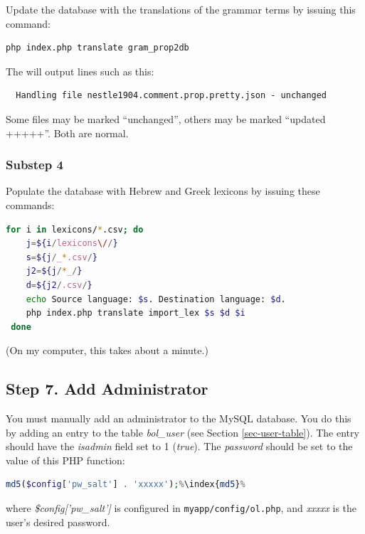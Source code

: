 \documentclass[11pt,oneside,a4paper]{memoir}
\newcommand{\q}{{\mainnolig '}}
\begin{document}
Update the database with the translations of the grammar terms by issuing this command:

\begin{lstlisting}[language=bash]
php index.php translate gram_prop2db
\end{lstlisting}

The will output lines such as this:

\begin{lstlisting}
  Handling file nestle1904.comment.prop.pretty.json - unchanged
\end{lstlisting}

Some files may be marked ``unchanged'', others may be marked ``updated +++++''. Both are normal.

\subsubsection*{Substep 4}

Populate the database with Hebrew and Greek lexicons by issuing these commands:
\begin{lstlisting}[language=bash]
for i in lexicons/*.csv; do
    j=${i/lexicons\//}
    s=${j/_*.csv/}
    j2=${j/*_/}
    d=${j2/.csv/}
    echo Source language: $s. Destination language: $d.
    php index.php translate import_lex $s $d $i
 done
\end{lstlisting}

(On my computer, this takes about a minute.)


\subsection{Step 7. Add Administrator}

You must manually add an administrator to the MySQL database. You do this by adding an entry to the
table \emph{bol\_user} (see Section \ref{sec-user-table}).
The entry should have the \emph{isadmin} field set to 1 (\emph{true}). The
\emph{password} should be set to the value of this PHP function:

\begin{lstlisting}[language=PHP]
md5($config['pw_salt'] . 'xxxxx');%\index{md5}%
\end{lstlisting}

\noindent
where \emph{\$config[\q pw\_salt\q]} is configured in \texttt{myapp/config/ol.php}, and
\emph{xxxxx} is the user's desired password.
\end{document}
